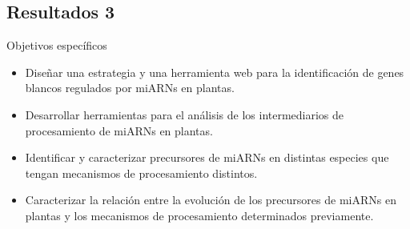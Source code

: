 \documentclass{beamer}
\begin{document}

\subsection{Resultados 3}

\begin{frame}{Objetivos específicos}
		\pause
		\begin{itemize}
            \item<-1> Diseñar una estrategia y una herramienta web para la identificación de genes blancos regulados por miARNs en plantas.
			\item<-1> Desarrollar herramientas para el análisis de los intermediarios de procesamiento de miARNs en plantas.
			\item<-1> Identificar y caracterizar precursores de miARNs en distintas especies que tengan mecanismos de procesamiento distintos.
			\item<-2> Caracterizar la relación entre la evolución de los precursores de miARNs en plantas y los mecanismos de procesamiento determinados previamente.
        \end{itemize}
\end{frame}
\end{document}
